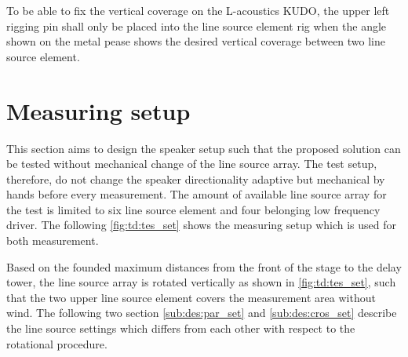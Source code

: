 
To be able to fix the vertical coverage on the L-acoustics KUDO, the upper left rigging pin shall only be placed into the line source element rig when the angle shown on the metal pease shows the desired vertical coverage between two line source element.  


\section{Measuring setup}\label{sec:pro:test_setup}
This section aims to design the speaker setup such that the proposed solution can be tested without mechanical change of the line source array. The test setup, therefore, do not change the speaker directionality adaptive but mechanical by hands before every measurement. The amount of available line source array for the test is limited to six line source element and four belonging low frequency driver. The following \autoref{fig:td:tes_set} shows the measuring setup which is used for both measurement.


Based on the founded maximum distances from the front of the stage to the delay tower, the line source array is rotated vertically as shown in \autoref{fig:td:tes_set}, such that the two upper line source element covers the measurement area without wind. The following two section \autoref{sub:des:par_set} and \autoref{sub:des:cros_set} describe the line source settings which differs from each other with respect to the rotational procedure. 


